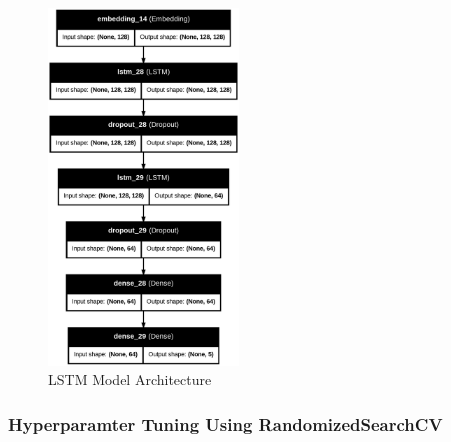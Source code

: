 \begin{figure}[h!]  
    \centering
    \includegraphics[width=0.45\textwidth]{Images/LSTM MODEL.png}  
    \caption{LSTM Model Architecture}
    \label{lstm arch}  %
\end{figure}


\subsubsection{Hyperparamter Tuning Using RandomizedSearchCV}

